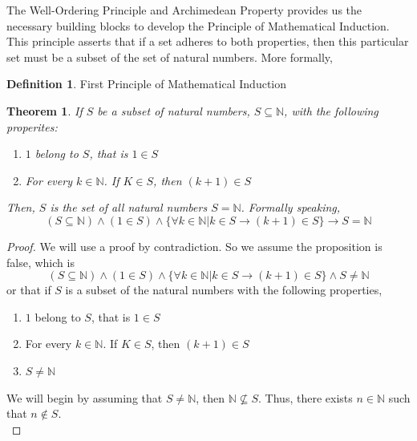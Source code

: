 \documentclass{book}
\newtheorem{theorem}{Theorem}[section]
\theoremstyle{definition}
\newtheorem{definition}{Definition}[section]
\theoremstyle{remark}
\newcommand{\bb}[1]{\mathbb{#1}}
\begin{document}
\newpage
The Well-Ordering Principle and Archimedean Property provides us the necessary building blocks to develop the Principle of Mathematical Induction. This principle asserts that if a set adheres to both properties, then this particular set must be a subset of the set of natural numbers. More formally, 

\begin{definition}
First Principle of Mathematical Induction \\

\begin{tcolorbox}
    \begin{theorem}
        If $S$ be a subset of natural numbers, $S \subseteq \bb{N}$, with the following properites: 
            \begin{enumerate}
                \item $1$ belong to $S$, that is  $1 \in S$
                \item For every $k \in \bb{N}$. If $K \in S$, then $(k+1) \in S$
            \end{enumerate}
        Then, $S$ is the set of all natural numbers $S = \bb{N}$. Formally speaking,
            \begin{equation*}
                (S \subseteq \bb{N}) \wedge(1 \in S) \wedge \{\forall k \in \bb{N} | k \in S \to (k+1) \in S \} \to S=\bb{N}
            \end{equation*}
    \end{theorem}
\end{tcolorbox}

\begin{proof}
    We will use a proof by contradiction. So we assume the proposition is false, which is
        \begin{equation*}
            (S \subseteq \bb{N}) \wedge(1 \in S) \wedge \{\forall k \in \bb{N} | k \in S \to (k+1) \in S \} \wedge S \neq \bb{N}
        \end{equation*}
    or that if $S$ is a subset of the natural numbers with the following properties, 
        \begin{enumerate}
            \item $1$ belong to $S$, that is  $1 \in S$
            \item For every $k \in \bb{N}$. If $K \in S$, then $(k+1) \in S$
            \item $S \neq \bb{N}$
        \end{enumerate}
    We will begin by assuming that $S \neq \bb{N}$, then $\bb{N} \nsubseteq S$. Thus, there exists $n \in \bb{N}$ such that $n \notin S$. \\
    

\end{proof}
\end{definition}
\end{document}
